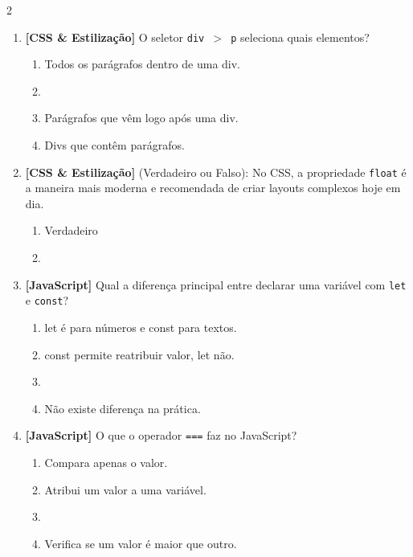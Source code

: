 \documentclass[a4paper,10pt]{article}
\begin{document}
\begin{multicols*}{2}
\begin{enumerate}[label=\textbf{\arabic*.}, resume, leftmargin=*]
\item \textbf{[CSS \& Estilização]} O seletor \texttt{div $>$ p} seleciona quais elementos?
\begin{enumerate}[label=(\alph*), noitemsep]
  \item Todos os parágrafos dentro de uma div.
  \item {}
  \item Parágrafos que vêm logo após uma div.
  \item Divs que contêm parágrafos.
\end{enumerate}

\item \textbf{[CSS \& Estilização]} (Verdadeiro ou Falso): No CSS, a propriedade \texttt{float} é a maneira mais moderna e recomendada de criar layouts complexos hoje em dia.
\begin{enumerate}[label=(\alph*), noitemsep]
  \item Verdadeiro
  \item {}
\end{enumerate}

\item \textbf{[JavaScript]} Qual a diferença principal entre declarar uma variável com \texttt{let} e \texttt{const}?
\begin{enumerate}[label=(\alph*), noitemsep]
  \item let é para números e const para textos.
  \item const permite reatribuir valor, let não.
  \item {}
  \item Não existe diferença na prática.
\end{enumerate}

\item \textbf{[JavaScript]} O que o operador \texttt{===} faz no JavaScript?
\begin{enumerate}[label=(\alph*), noitemsep]
  \item Compara apenas o valor.
  \item Atribui um valor a uma variável.
  \item {}
  \item Verifica se um valor é maior que outro.
\end{enumerate}


\end{enumerate}
\end{multicols*}
\end{document}
